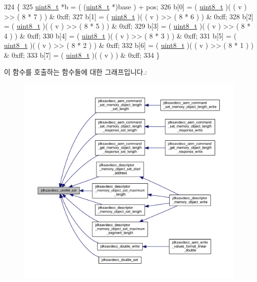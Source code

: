 \begin{DoxyCode}
324 \{
325     \hyperlink{stdint_8h_aba7bc1797add20fe3efdf37ced1182c5}{uint8\_t} *b = ( (\hyperlink{stdint_8h_aba7bc1797add20fe3efdf37ced1182c5}{uint8\_t} *)base ) + pos;
326     b[0] = ( \hyperlink{stdint_8h_aba7bc1797add20fe3efdf37ced1182c5}{uint8\_t} )( ( v ) >> ( 8 * 7 ) ) & 0xff;
327     b[1] = ( \hyperlink{stdint_8h_aba7bc1797add20fe3efdf37ced1182c5}{uint8\_t} )( ( v ) >> ( 8 * 6 ) ) & 0xff;
328     b[2] = ( \hyperlink{stdint_8h_aba7bc1797add20fe3efdf37ced1182c5}{uint8\_t} )( ( v ) >> ( 8 * 5 ) ) & 0xff;
329     b[3] = ( \hyperlink{stdint_8h_aba7bc1797add20fe3efdf37ced1182c5}{uint8\_t} )( ( v ) >> ( 8 * 4 ) ) & 0xff;
330     b[4] = ( \hyperlink{stdint_8h_aba7bc1797add20fe3efdf37ced1182c5}{uint8\_t} )( ( v ) >> ( 8 * 3 ) ) & 0xff;
331     b[5] = ( \hyperlink{stdint_8h_aba7bc1797add20fe3efdf37ced1182c5}{uint8\_t} )( ( v ) >> ( 8 * 2 ) ) & 0xff;
332     b[6] = ( \hyperlink{stdint_8h_aba7bc1797add20fe3efdf37ced1182c5}{uint8\_t} )( ( v ) >> ( 8 * 1 ) ) & 0xff;
333     b[7] = ( \hyperlink{stdint_8h_aba7bc1797add20fe3efdf37ced1182c5}{uint8\_t} )( ( v ) ) & 0xff;
334 \}
\end{DoxyCode}


이 함수를 호출하는 함수들에 대한 그래프입니다.\+:
\nopagebreak
\begin{figure}[H]
\begin{center}
\leavevmode
\includegraphics[width=350pt]{group__endian_ga48c6225616d8c003861be5c423a36631_icgraph}
\end{center}
\end{figure}


